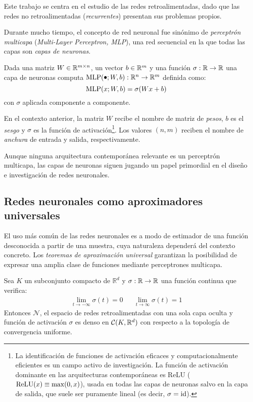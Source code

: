 Este trabajo se centra en el estudio de las redes retroalimentadas, dado que las redes no retroalimentadas (\textit{recurrentes}) presentan sus problemas propios.

Durante mucho tiempo, el concepto de red neuronal fue sinónimo de \textit{perceptrón multicapa} (\textit{Multi-Layer Perceptron, MLP}), una red secuencial en la que todas las capas son \textit{capas de neuronas}.

\begin{definition}
    Dada una matriz \( W \in \mathbb{R}^{m \times n} \), un vector \( b \in \mathbb{R}^{m} \) y una función \( \sigma: \mathbb{R} \to \mathbb{R} \) una capa de neuronas computa \( \MLP(\smallbullet; W, b): \real{n} \to \real{m} \) definida como:
    \[
        \operatorname{MLP}(x; W, b) = \sigma(Wx + b)
    \]
    con \( \sigma \) aplicada componente a componente.

    En el contexto anterior, la matriz \( W \) recibe el nombre de matriz de \textit{pesos}, \( b \) es el \textit{sesgo} y \( \sigma \) es la función de activación\footnote{La identificación de funciones de activación eficaces y computacionalmente eficientes es un campo activo de investigación. La función de activación dominante en las arquitecturas contemporáneas es ReLU (\( \operatorname{ReLU}(x) \equiv \max(0, x) \)), usada en todas las capas de neuronas salvo en la capa de salida, que suele ser puramente lineal (es decir, \( \sigma = \operatorname{id} \)).
    }. Los valores \( (n, m) \) reciben el nombre de \textit{anchura} de entrada y salida, respectivamente.
\end{definition}

Aunque ninguna arquitectura contemporánea relevante es un perceptrón multicapa, las capas de neuronas siguen jugando un papel primordial en el diseño e investigación de redes neuronales.

\subsection{Redes neuronales como aproximadores universales}    
El uso más común de las redes neuronales es a modo de estimador de una función desconocida a partir de una muestra, cuya naturaleza dependerá del contexto concreto. Los \textit{teoremas de aproximación universal} garantizan la posibilidad de expresar una amplia clase de funciones mediante perceptrones multicapa.
\begin{theorem}
Sea  \( K \) un subconjunto compacto de \( \mathbb{R}^d \) y \( \sigma: \mathbb{R} \to \mathbb{R} \) una función continua que verifica:
\begin{align*}
    \lim_{t \to -\infty} \sigma(t) = 0 && \lim_{t \to \infty} \sigma(t) = 1 
\end{align*}
Entonces \( \mathcal{N} \), el espacio de redes retroalimentadas con una sola capa oculta y función de activación \( \sigma \)  es denso en \( \mathcal{C} (K, \mathbb{R}^{d}) \) con respecto a la topología de convergencia uniforme.
\end{theorem}

